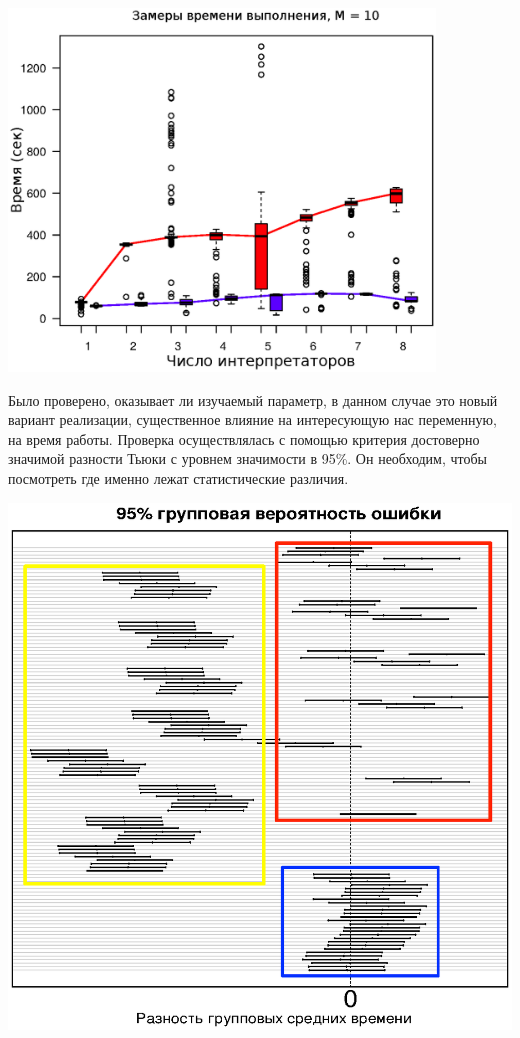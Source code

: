 \noindent
\begin{center}
\includegraphics[width=0.85\textwidth]{m10}
\end{center}

Было проверено, оказывает ли изучаемый параметр,
в данном случае это новый вариант реализации,
существенное влияние на интересующую нас
переменную, на время работы.
Проверка осуществлялась с помощью
критерия достоверно значимой
разности Тьюки
с уровнем значимости в 95\%.
Он необходим, чтобы посмотреть
где именно лежат статистические различия.

\bigskip
\begin{center}
\includegraphics{tukey}
\end{center}

